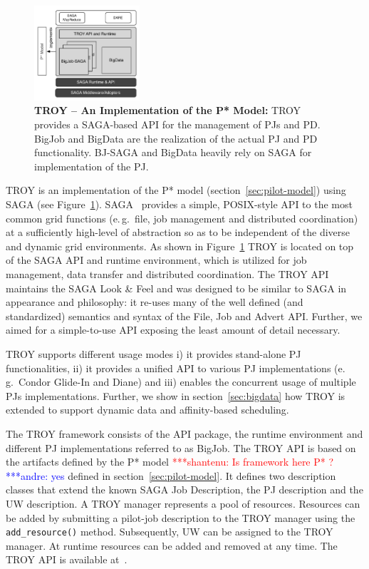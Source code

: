 \documentclass[conference,final]{IEEEtran}
\newcommand{\jhanote}[1]{ {\textcolor{red} { ***shantenu: #1 }}}
\newcommand{\alnote}[1]{ {\textcolor{blue} { ***andre: #1 }}}
\newcommand{\alnote}[1]{}
\newcommand{\jhanote}[1]{}
\newcommand{\upp}{\vspace*{-0.5em}}
\begin{document}

\begin{figure}[t]
	\centering
		\includegraphics[width=0.35\textwidth]{figures/pstar_troy.pdf}
	\caption{\textbf{TROY -- An Implementation of the P* Model:}  TROY provides 
	a SAGA-based API for the management of PJs and PD. BigJob and BigData are 
	the realization of the actual PJ and PD functionality. BJ-SAGA and BigData 
	heavily rely on SAGA for implementation of the PJ.\upp
	}
	\label{fig:figures_pstar_troy}
\end{figure}

TROY is an implementation of the P* model (section~\ref{sec:pilot-model}) using
SAGA (see Figure~\ref{fig:figures_pstar_troy}). SAGA~\cite{saga_url,saga_gfd90}
provides a simple, POSIX-style API to the most common grid functions (e.\,g.\
file, job management and distributed coordination) at a sufficiently high-level
of abstraction so as to be independent of the diverse and dynamic grid
environments. As shown in Figure~\ref{fig:figures_pstar_troy} TROY is located on
top of the SAGA API and runtime environment, which is utilized for job
management, data transfer and distributed coordination. The TROY API maintains
the SAGA Look \& Feel and was designed to be similar to SAGA in appearance and
philosophy: it re-uses many of the well defined (and standardized) semantics and
syntax of the File, Job and Advert API. Further, we aimed for a simple-to-use
API exposing the least amount of detail necessary.

TROY supports different usage modes i) it provides stand-alone
PJ functionalities, ii) it provides a unified API to various
PJ implementations (e.\,g.\ Condor Glide-In and Diane) and iii)
enables the concurrent usage of multiple PJs
implementations. Further, we show in section~\ref{sec:bigdata} how
TROY is extended to support dynamic data and affinity-based
scheduling.

The TROY framework consists of the API package, the runtime environment and
different PJ implementations referred to as BigJob. The TROY API is based on the
artifacts defined by the P* model \jhanote{Is framework here P* ?}\alnote{yes} defined in
section~\ref{sec:pilot-model}. It defines two description classes that extend
the known SAGA Job Description, the PJ description and the UW description. A
TROY manager represents a pool of resources. Resources can be added by
submitting a pilot-job description to the TROY manager using the
\texttt{add\_resource()} method. Subsequently, UW can be assigned to the TROY
manager. At runtime resources can be added and removed at any time. 
The TROY API is available at~\cite{troy_api}.
\end{document}
